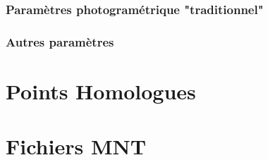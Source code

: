 \subsubsection{Param\`etres photogram\'etrique "traditionnel"}


\subsubsection{Autres param\`etres}



\section{Points Homologues}
\label{Format:Homol}

\section{Fichiers MNT}
\label{Format:MNT}


